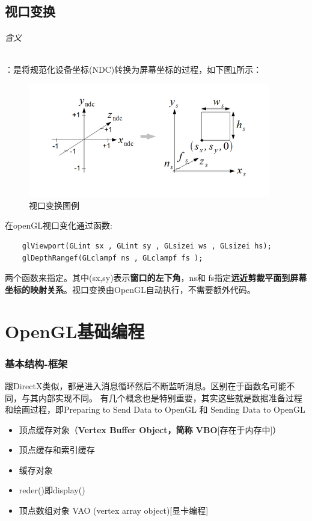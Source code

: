 \documentclass[UTF8,a4paper,8pt]{ctexbook}
\begin{document}
	\section{视口变换}
		\subparagraph{含义}：是将规范化设备坐标(NDC)转换为屏幕坐标的过程，如下图\ref{shikou}所示：
			\begin{figure}[htbp]
				\centering
				\includegraphics[scale = 1.2]{viewPort.png}
				\caption{视口变换图例}
				\label{shikou}
			\end{figure}
			
			在openGL视口变化通过函数: 
			\begin{lstlisting}
	glViewport(GLint sx , GLint sy , GLsizei ws , GLsizei hs); 
	glDepthRangef(GLclampf ns , GLclampf fs );
			\end{lstlisting}
			
			两个函数来指定。其中(sx,sy)表示\textbf{窗口的左下角}，ns和 fs指定\textbf{远近剪裁平面到屏幕坐标的映射关系}。视口变换由OpenGL自动执行，不需要额外代码。
\chapter{OpenGL基础编程}
	
	\subsection{基本结构-框架}
		跟DirectX类似，都是进入消息循环然后不断监听消息。区别在于函数名可能不同，与其内部实现不同。
		有几个概念也是特别重要，其实这些就是数据准备过程和绘画过程，即Preparing to Send Data to OpenGL 和 Sending Data to OpenGL
		
		\begin{itemize}
			\item  顶点缓存对象（\textbf{Vertex Buffer Object，简称 VBO}[存在于内存中]）
			\item  顶点缓存和索引缓存
			\item  缓存对象
			\item  reder()即display()
			\item 顶点数组对象 VAO (vertex array object)[显卡编程]
		\end{itemize}
		
\end{document}
